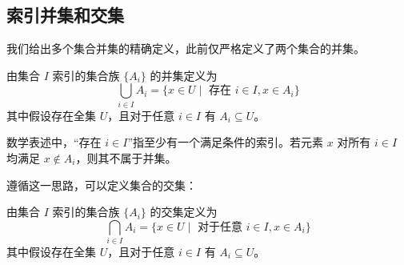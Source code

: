 \subsection{索引并集和交集}\label{sec:section3.6.2}

我们给出多个集合并集的精确定义，此前仅严格定义了两个集合的并集。

\begin{definition}\label{def:definition3.6.1}
    由集合 $I$ 索引的集合族 $\{A_i\}$ 的并集定义为
    \[\bigcup_{i \in I} A_i = \{x \in U \mid \text{\ 存在\ } i \in I, x \in A_i \}\]
    其中假设存在全集 $U$，且对于任意 $i \in I$ 有 $A_i \subseteq U$。
\end{definition}

数学表述中，``存在 $i \in I$''指至少有一个满足条件的索引。若元素 $x$ 对所有 $i \in I$ 均满足 $x \notin A_i$，则其不属于并集。

遵循这一思路，可以定义集合的交集：

\begin{definition}\label{def:definition3.6.2}
    由集合 $I$ 索引的集合族 $\{A_i\}$ 的交集定义为
    \[\bigcap_{i \in I} A_i = \{x \in U \mid \text{\ 对于任意\ } i \in I, x \in A_i \}\]
    其中假设存在全集 $U$，且对于任意 $i \in I$ 有 $A_i \subseteq U$。
\end{definition}
